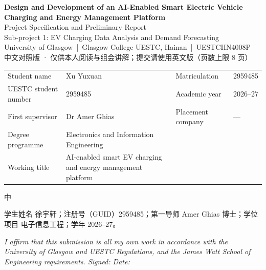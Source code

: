 \documentclass[10pt,a4paper]{article}
\newenvironment{zh}{%
  \par\vspace{1pt}%
  \begingroup
  \color{black!72}\small
  \setlength{\parskip}{0pt}%
  \noindent\textsf{\footnotesize 中}\hspace{3pt}\ignorespaces
}{%
  \par\endgroup\vspace{4pt}%
}
\begin{document}
\begin{center}
  {\large\bfseries Design and Development of an AI-Enabled Smart Electric Vehicle\\
   Charging and Energy Management Platform}\\[4pt]
  {\normalsize Project Specification and Preliminary Report}\\[2pt]
  {\small Sub-project 1: EV Charging Data Analysis and Demand Forecasting}\\[2pt]
  {\small University of Glasgow \,|\, Glasgow College UESTC, Hainan \,|\, UESTCHN4008P}\\[4pt]
  {\small\color{black!65} 中文对照版 · 仅供本人阅读与组会讲解；提交请使用英文版（页数上限 8 页）}
\end{center}

\vspace{-2pt}
{\small
\renewcommand{\arraystretch}{1.15}
\begin{tabular}{@{}p{3.5cm}p{6.6cm}p{2.9cm}p{1.9cm}@{}}
\toprule
Student name & Xu Yuxuan & Matriculation & 2959485 \\
UESTC student number & 2959485 & Academic year & 2026--27 \\
First supervisor & Dr Amer Ghias & Placement company & --- \\
Degree programme & Electronics and Information Engineering & & \\
Working title & AI-enabled smart EV charging and energy management platform & & \\
\bottomrule
\end{tabular}
}

\vspace{2pt}
\begin{zh}
学生姓名 徐宇轩；注册号（GUID）2959485；第一导师 Amer Ghias 博士；学位项目 电子信息工程；学年 2026--27。
\end{zh}

{\footnotesize\itshape
I affirm that this submission is all my own work in accordance with the University of Glasgow and
UESTC Regulations, and the James Watt School of Engineering requirements. \hfill Signed:
\underline{\hspace{4.2cm}} \quad Date: \underline{\hspace{2.2cm}}}

\end{document}
